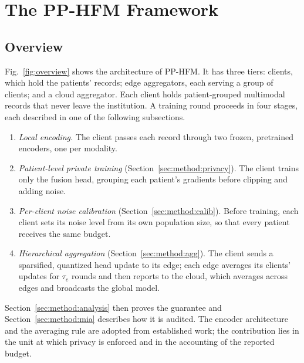 \section{The PP-HFM Framework}
\label{sec:method}

\subsection{Overview}
\label{sec:method:overview}
Fig.~\ref{fig:overview} shows the architecture of PP-HFM. It has three
tiers: clients, which hold the patients' records; edge aggregators, each
serving a group of clients; and a cloud aggregator. Each client holds
patient-grouped multimodal records that never leave the institution. A
training round proceeds in four stages, each described in one of the
following subsections.
\begin{enumerate}
\item \emph{Local encoding.} The client passes each record through two
frozen, pretrained encoders, one per modality.
\item \emph{Patient-level private training} (Section~\ref{sec:method:privacy}).
The client trains only the fusion head, grouping each patient's gradients
before clipping and adding noise.
\item \emph{Per-client noise calibration} (Section~\ref{sec:method:calib}).
Before training, each client sets its noise level from its own population
size, so that every patient receives the same budget.
\item \emph{Hierarchical aggregation} (Section~\ref{sec:method:agg}). The
client sends a sparsified, quantized head update to its edge; each edge
averages its clients' updates for $\tau_e$ rounds and then reports to the
cloud, which averages across edges and broadcasts the global model.
\end{enumerate}
Section~\ref{sec:method:analysis} then proves the guarantee and
Section~\ref{sec:method:mia} describes how it is audited. The encoder
architecture and the averaging rule are adopted from established work; the
contribution lies in the unit at which privacy is enforced and in the
accounting of the reported budget.


